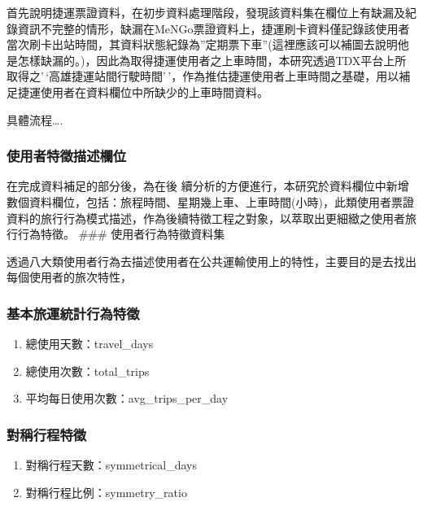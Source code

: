 首先說明捷運票證資料，在初步資料處理階段，發現該資料集在欄位上有缺漏及紀錄資訊不完整的情形，缺漏在MeNGo票證資料上，捷運刷卡資料僅記錄該使用者當次刷卡出站時間，其資料狀態紀錄為''定期票下車''(這裡應該可以補圖去說明他是怎樣缺漏的。)，因此為取得捷運使用者之上車時間，本研究透過TDX平台上所取得之'\,`高雄捷運站間行駛時間'\,'，作為推估捷運使用者上車時間之基礎，用以補足捷運使用者在資料欄位中所缺少的上車時間資料。

具體流程\ldots.

\subsubsection{使用者特徵描述欄位}\label{ux4f7fux7528ux8005ux7279ux5fb5ux63cfux8ff0ux6b04ux4f4d}

在完成資料補足的部分後，為在後
續分析的方便進行，本研究於資料欄位中新增數個資料欄位，包括：旅程時間、星期幾上車、上車時間(小時)，此類使用者票證資料的旅行行為模式描述，作為後續特徵工程之對象，以萃取出更細緻之使用者旅行行為特徵。
\#\#\# 使用者行為特徵資料集

透過八大類使用者行為去描述使用者在公共運輸使用上的特性，主要目的是去找出每個使用者的旅次特性，

\subsubsection{基本旅運統計行為特徵}\label{ux57faux672cux65c5ux904bux7d71ux8a08ux884cux70baux7279ux5fb5}

\begin{enumerate}
\def\labelenumi{\arabic{enumi}.}
\tightlist
\item
  總使用天數：travel\_days
\item
  總使用次數：total\_trips
\item
  平均每日使用次數：avg\_trips\_per\_day
\end{enumerate}

\subsubsection{對稱行程特徵}\label{ux5c0dux7a31ux884cux7a0bux7279ux5fb5}

\begin{enumerate}
\def\labelenumi{\arabic{enumi}.}
\tightlist
\item
  對稱行程天數：symmetrical\_days
\item
  對稱行程比例：symmetry\_ratio
\end{enumerate}


